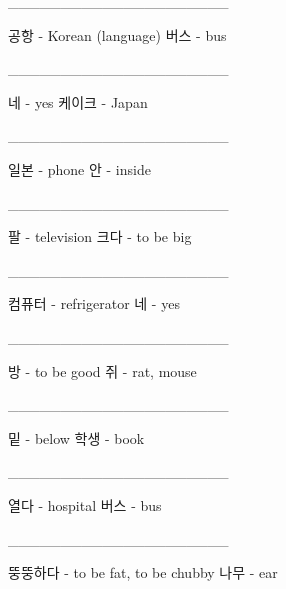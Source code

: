 \documentclass[addpoints, 30pt]{../exam}%
\begin{document}
\begin{questions}
\question[1]%
\_\_\_\_\_\_\_\_\_\_\_\_\_\_\_\_\_\_\_\_\_%
\begin{choices}%
\choice%
공항 {-} Korean (language)%
\CorrectChoice%
버스 {-} bus%
\end{choices}%
\question[1]%
\_\_\_\_\_\_\_\_\_\_\_\_\_\_\_\_\_\_\_\_\_%
\begin{choices}%
\CorrectChoice%
네 {-} yes%
\choice%
케이크 {-} Japan%
\end{choices}%
\question[1]%
\_\_\_\_\_\_\_\_\_\_\_\_\_\_\_\_\_\_\_\_\_%
\begin{choices}%
\choice%
일본 {-} phone%
\CorrectChoice%
안 {-} inside%
\end{choices}%
\question[1]%
\_\_\_\_\_\_\_\_\_\_\_\_\_\_\_\_\_\_\_\_\_%
\begin{choices}%
\choice%
팔 {-} television%
\CorrectChoice%
크다 {-} to be big%
\end{choices}%
\question[1]%
\_\_\_\_\_\_\_\_\_\_\_\_\_\_\_\_\_\_\_\_\_%
\begin{choices}%
\choice%
컴퓨터 {-} refrigerator%
\CorrectChoice%
네 {-} yes%
\end{choices}%
\question[1]%
\_\_\_\_\_\_\_\_\_\_\_\_\_\_\_\_\_\_\_\_\_%
\begin{choices}%
\choice%
방 {-} to be good%
\CorrectChoice%
쥐 {-} rat, mouse%
\end{choices}%
\question[1]%
\_\_\_\_\_\_\_\_\_\_\_\_\_\_\_\_\_\_\_\_\_%
\begin{choices}%
\CorrectChoice%
밑 {-} below%
\choice%
학생 {-} book%
\end{choices}%
\question[1]%
\_\_\_\_\_\_\_\_\_\_\_\_\_\_\_\_\_\_\_\_\_%
\begin{choices}%
\choice%
열다 {-} hospital%
\CorrectChoice%
버스 {-} bus%
\end{choices}%
\question[1]%
\_\_\_\_\_\_\_\_\_\_\_\_\_\_\_\_\_\_\_\_\_%
\begin{choices}%
\CorrectChoice%
뚱뚱하다 {-} to be fat, to be chubby%
\choice%
나무 {-} ear%
\end{choices}%
\end{questions}%
\end{document}
